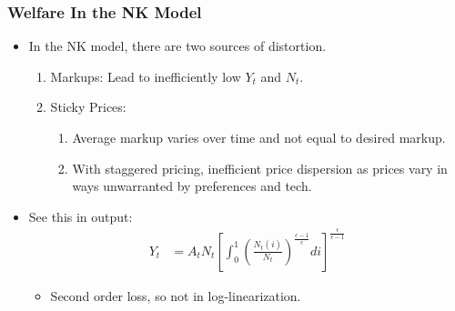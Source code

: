 \documentclass[english,xcolor=svgnames]{beamer}
\begin{document}
\begin{frame}
\frametitle{Welfare In the NK Model}
\begin{itemize}
	\item In the NK model, there are two sources of distortion.
	\begin{enumerate}[1.]
		\item Markups: Lead to inefficiently low $Y_t$ and $N_t$.
		\item Sticky Prices:
		\begin{enumerate}[{2.}1]
			\item Average markup varies over time and not equal to desired markup.
			\item With staggered pricing, inefficient price dispersion as prices vary in ways unwarranted by preferences and tech.
		\end{enumerate}
		\end{enumerate}
		\item See this in output:
		\begin{align*}	Y_t&=A_tN_t\left[\int_0^1\left(\frac{N_t(i)}{N_t}\right)^{\frac{\epsilon-1}{\epsilon}}di\right]^{\frac{\epsilon}{\epsilon-1}} 
		\end{align*}
		\begin{itemize}
				\item Second order loss, so not in log-linearization.

		\end{itemize}
	
\end{itemize}
\end{frame}
\end{document}
